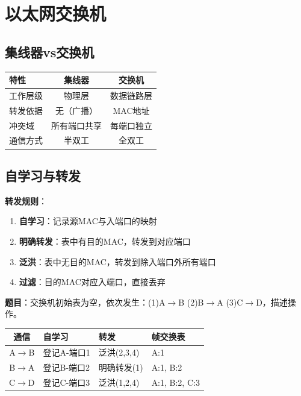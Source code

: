 \section{以太网交换机}
\subsection{集线器vs交换机}
\begin{table}[htbp]
\centering\small
\begin{tabular}{lcc}
\toprule
\textbf{特性} & \textbf{集线器} & \textbf{交换机} \\
\midrule
工作层级 & 物理层 & 数据链路层 \\
转发依据 & 无（广播） & MAC地址 \\
冲突域 & 所有端口共享 & 每端口独立 \\
通信方式 & 半双工 & 全双工 \\
\bottomrule
\end{tabular}
\end{table}

\subsection{自学习与转发}
\textbf{转发规则}：
\begin{enumerate}[leftmargin=2em,itemsep=0pt]
    \item \textbf{自学习}：记录源MAC与入端口的映射
    \item \textbf{明确转发}：表中有目的MAC，转发到对应端口
    \item \textbf{泛洪}：表中无目的MAC，转发到除入端口外所有端口
    \item \textbf{过滤}：目的MAC对应入端口，直接丢弃
\end{enumerate}

\begin{examplebox}[例题3.5 交换机转发]
\textbf{题目}：交换机初始表为空，依次发生：(1)A$\to$B (2)B$\to$A (3)C$\to$D，描述操作。
\tcblower
\begin{tabular}{|c|l|l|l|}
\hline
\textbf{通信} & \textbf{自学习} & \textbf{转发} & \textbf{帧交换表} \\
\hline
A$\to$B & 登记A-端口1 & 泛洪(2,3,4) & A:1 \\
B$\to$A & 登记B-端口2 & 明确转发(1) & A:1, B:2 \\
C$\to$D & 登记C-端口3 & 泛洪(1,2,4) & A:1, B:2, C:3 \\
\hline
\end{tabular}
\end{examplebox}

